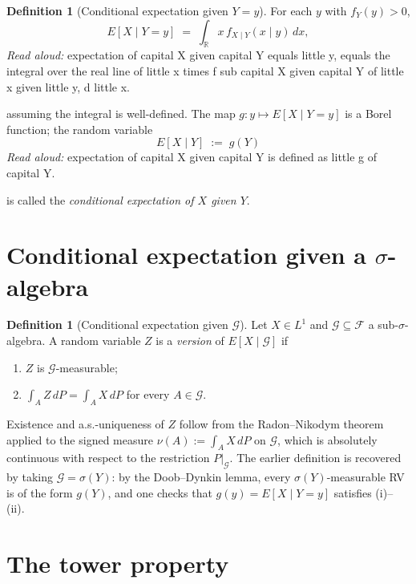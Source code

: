 \documentclass[11pt]{article}
\theoremstyle{definition}
\newtheorem{definition}[theorem]{Definition}
\begin{document}
\begin{definition}[Conditional expectation given $Y = y$]
For each $y$ with $f_Y(y) > 0$,
\[
E[X \mid Y = y] \;=\; \int_{\mathbb{R}} x \, f_{X \mid Y}(x \mid y)\, dx,
\]
\emph{Read aloud:} expectation of capital X given capital Y equals little y, equals the integral over the real line of little x times f sub capital X given capital Y of little x given little y, d little x.

assuming the integral is well-defined. The map $g : y \mapsto E[X \mid Y = y]$ is a Borel function; the random variable
\[
E[X \mid Y] \;:=\; g(Y)
\]
\emph{Read aloud:} expectation of capital X given capital Y is defined as little g of capital Y.

is called the \emph{conditional expectation of $X$ given $Y$}.
\end{definition}

\section{Conditional expectation given a $\sigma$-algebra}

\begin{definition}[Conditional expectation given $\mathcal{G}$]
Let $X \in L^1$ and $\mathcal{G} \subseteq \mathcal{F}$ a sub-$\sigma$-algebra. A random variable $Z$ is a \emph{version} of $E[X \mid \mathcal{G}]$ if
\begin{enumerate}
  \item[(i)] $Z$ is $\mathcal{G}$-measurable;
  \item[(ii)] $\displaystyle \int_A Z \, dP = \int_A X \, dP$ for every $A \in \mathcal{G}$.
\end{enumerate}
\end{definition}

Existence and a.s.-uniqueness of $Z$ follow from the Radon--Nikodym theorem applied to the signed measure $\nu(A) := \int_A X \, dP$ on $\mathcal{G}$, which is absolutely continuous with respect to the restriction $P|_{\mathcal{G}}$. The earlier definition is recovered by taking $\mathcal{G} = \sigma(Y)$: by the Doob--Dynkin lemma, every $\sigma(Y)$-measurable RV is of the form $g(Y)$, and one checks that $g(y) = E[X \mid Y = y]$ satisfies (i)--(ii).

\section{The tower property}
\end{document}
